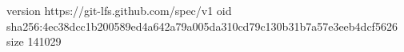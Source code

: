 version https://git-lfs.github.com/spec/v1
oid sha256:4ec38dcc1b200589ed4a642a79a005da310cd79c130b31b7a57e3eeb4dcf5626
size 141029
